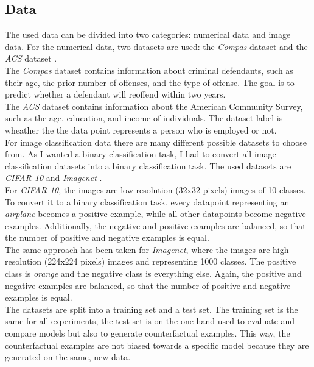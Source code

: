 \documentclass{article}
\begin{document}
\subsection{Data}
The used data can be divided into two categories: numerical data and image data. For the numerical data, two datasets are used: the \textit{Compas} dataset \cite{compas_dataset} and the \textit{ACS} dataset \cite{acs_dataset}. \\
The \textit{Compas} dataset contains information about criminal defendants, such as their age, the prior number of offenses, and the type of offense. The goal is to predict whether a defendant will reoffend within two years. \\
The \textit{ACS} dataset contains information about the American Community Survey, such as the age, education, and income of individuals. The dataset label is wheather the the data point represents a person who is employed or not. \\
For image classification data there are many different possible datasets to choose from. As I wanted a binary classification task, I had to convert all image classification datasets into a binary classification task. The used datasets are \textit{CIFAR-10} \cite{cifar10_dataset} and \textit{Imagenet} \cite{imagenet_dataset}. \\
For \textit{CIFAR-10}, the images are low resolution (32x32 pixels) images of 10 classes. To convert it to a binary classification task, every datapoint representing an \textit{airplane} becomes a positive example, while all other datapoints become negative examples. Additionally, the negative and positive examples are balanced, so that the number of positive and negative examples is equal.\\
The same approach has been taken for \textit{Imagenet}, where the images are high resolution (224x224 pixels) images and representing 1000 classes. The positive class is \textit{orange} and the negative class is everything else. Again, the positive and negative examples are balanced, so that the number of positive and negative examples is equal.\\
The datasets are split into a training set and a test set. The training set is the same for all experiments, the test set is on the one hand used to evaluate and compare models but also to generate counterfactual examples. This way, the counterfactual examples are not biased towards a specific model because they are generated on the same, new data. 
\end{document}
